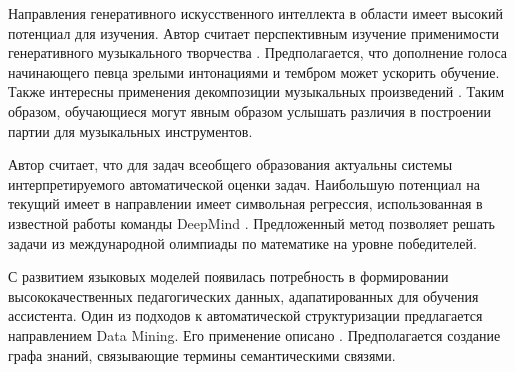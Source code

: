 Направления генеративного искусственного интеллекта в области имеет высокий потенциал для изучения. 
Автор считает перспективным изучение применимости генеративного музыкального творчества \cite{vinze2021application}.
Предполагается, что дополнение голоса начинающего певца зрелыми интонациями и тембром может ускорить обучение.
Также интересны применения декомпозиции музыкальных произведений \cite{simpson2015deep}. 
Таким образом, обучающиеся могут явным образом услышать различия в построении партии для музыкальных инструментов.

Автор считает, что для задач всеобщего образования актуальны системы интерпретируемого автоматической оценки задач.
Наибольшую потенциал на текущий имеет в направлении имеет символьная регрессия,
использованная в известной работы команды DeepMind \cite{trinh2024solving}. Предложенный метод позволяет решать
задачи из международной олимпиады по математике на уровне победителей.

С развитием языковых моделей появилась потребность в формировании высококачественных педагогических данных, 
адапатированных для обучения ассистента. Один из подходов к автоматической структуризации предлагается направлением Data Mining.
Его применение описано \cite{romero2013data}. Предполагается создание графа знаний, связывающие термины семантическими связями.


